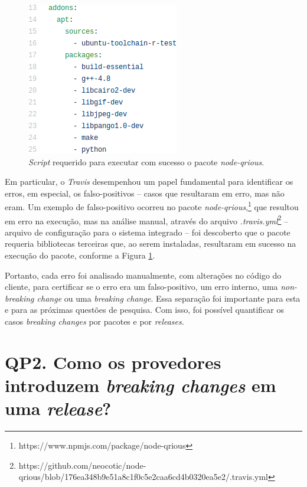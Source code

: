\begin{itemize}
    \begin{figure}
        \centering
        \includegraphics[scale=0.6]{figuras/false_positive.png}
        \caption{\textit{Script} requerido para executar com sucesso o pacote \textit{node-qrious}.}
        \label{fig:false-positive}
    \end{figure}{}

    Em particular, o \textit{Travis} desempenhou um papel fundamental para identificar os erros, em especial, os falso-positivos -- casos que resultaram em erro, mas não eram. Um exemplo de falso-positivo ocorreu no pacote \textit{node-qrious},\footnote{https://www.npmjs.com/package/node-qrious} que resultou em erro na execução, mas na análise manual, através do arquivo \textit{.travis.yml}\footnote{https://github.com/neocotic/node-qrious/blob/176ea348b9e51a8c1f0c5e2caa6cd4b0320ea5e2/.travis.yml} -- arquivo de configuração para o sistema integrado -- foi descoberto que o pacote requeria bibliotecas terceiras que, ao serem instaladas, resultaram em sucesso na execução do pacote, conforme a Figura \ref{fig:false-positive}.
\end{itemize}{}

Portanto, cada erro foi analisado manualmente, com alterações no código do cliente, para certificar se o erro era um falso-positivo, um erro interno, uma \textit{non-breaking change} ou uma \textit{breaking change}. Essa separação foi importante para esta e para as próximas questões de pesquisa. Com isso, foi possível quantificar os casos \textit{breaking changes} por pacotes e por \textit{releases}.

\section{QP2. Como os provedores introduzem \textit{breaking changes} em uma \textit{release}?}
\label{sec:qp2}

